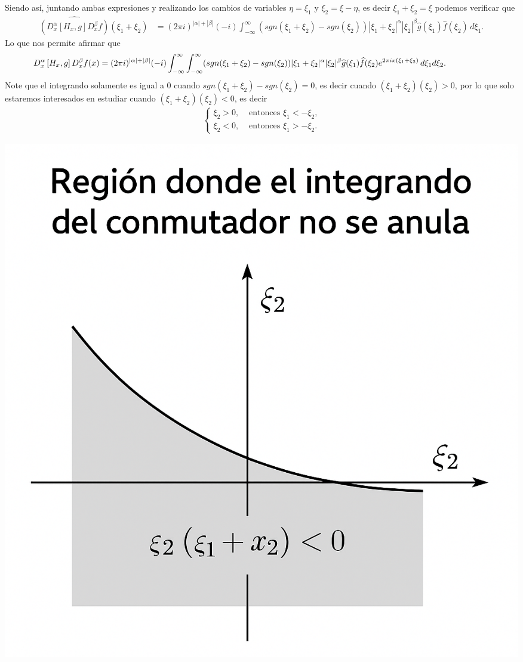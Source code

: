\documentclass{aleph-revista}
\renewcommand{\hat}{\widehat}
\begin{document}
  Siendo así, juntando ambas expresiones y realizando los cambios de variables $\eta=\xi_{1}$ y $\xi_{2}=\xi-\eta$, es decir $\xi_{1}+\xi_{2}=\xi$ podemos verificar que
  \begin{align*}
    \hat{\left( D_{x}^{\alpha}\left[ H_{x},g \right]D_{x}^{\beta}f \right)}(\xi_{1}+\xi_{2})&=(2\pi i)^{|\alpha|+|\beta|}(-i)\int_{-\infty}^{\infty}(sgn(\xi_{1}+\xi_{2})-sgn(\xi_{2}))|\xi_{1}+\xi_{2}|^{\alpha}|\xi_{2}|^{\beta}\hat{g}(\xi_{1})\hat{f}(\xi_{2})\, d\xi_{1}.
  \end{align*}
  Lo que nos permite afirmar que
  \begin{align*}
    \hspace{-1.5cm}D_{x}^{\alpha}\left[ H_{x},g \right]D_{x}^{\beta}f(x)&=(2\pi i)^{|\alpha|+|\beta|}(-i)\int_{-\infty}^{\infty}\int_{-\infty}^{\infty}(sgn(\xi_{1}+\xi_{2})-sgn(\xi_{2}))|\xi_{1}+\xi_{2}|^{\alpha}|\xi_{2}|^{\beta}\hat{g}(\xi_{1})\hat{f}(\xi_{2})e^{2\pi ix(\xi_{1}+\xi_{2})}\, d\xi_{1}d\xi_{2}. 
  \end{align*}
  Note que el integrando solamente es igual a $0$ cuando $sgn(\xi_{1}+\xi_{2})-sgn(\xi_{2})=0$, es decir cuando $(\xi_{1}+\xi_{2})(\xi_{2})>0$, por lo que solo estaremos interesados en estudiar cuando $(\xi_{1}+\xi_{2})(\xi_{2})<0$, es decir
  \begin{align*}
    \begin{cases}
      \xi_{2}>0, &\text{ entonces } \xi_{1}<-\xi_{2} \text{,} \\
      \xi_{2}<0, &\text{ entonces } \xi_{1}>-\xi_{2}.
    \end{cases}
  \end{align*}
  \begin{center}
    \includegraphics[scale=0.2]{Diagrama de conmutador en 2D.png}
  \end{center}
  
\end{document}
